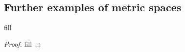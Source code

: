 \subsection{Further examples of metric spaces}

\begin{exercise}{1}
fill
\end{exercise}
\begin{proof}
fill
\end{proof}